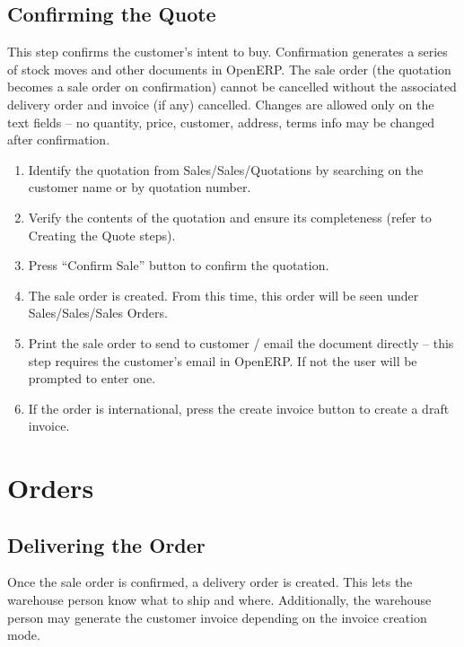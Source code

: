 \subsection{Confirming the Quote}
This step confirms the customer’s intent to buy. Confirmation generates a series of stock moves and other documents in OpenERP. The sale order (the quotation becomes a sale order on confirmation) cannot be cancelled without the associated delivery order and invoice (if any) cancelled. Changes are allowed only on the text fields – no quantity, price, customer, address, terms info may be changed after confirmation.
\begin{enumerate}
\item Identify the quotation from Sales/Sales/Quotations by searching on the customer name or by quotation number.
\item Verify the contents of the quotation and ensure its completeness (refer to Creating the Quote steps).
\item Press “Confirm Sale” button to confirm the quotation. 
\item The sale order is created. From this time, this order will be seen under Sales/Sales/Sales Orders.
\item Print the sale order to send to customer / email the document directly – this step requires the customer’s email in OpenERP. If not the user will be prompted to enter one. 
\item If the order is international, press the create invoice button to create a draft invoice.
\end{enumerate}

\section{Orders}

\subsection{Delivering the Order}
Once the sale order is confirmed, a delivery order is created. This lets the warehouse person know what to ship and where. Additionally, the warehouse person may generate the customer invoice depending on the invoice creation mode.
